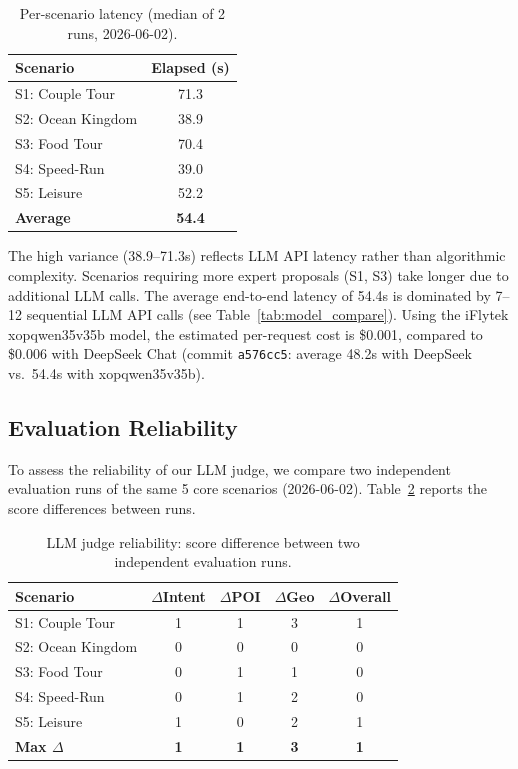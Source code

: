 \begin{table}[H]
\centering
\caption{Per-scenario latency (median of 2 runs, 2026-06-02).}
\label{tab:scenario_latency}
\begin{tabular}{@{}lc@{}}
\toprule
\textbf{Scenario} & \textbf{Elapsed (s)} \\
\midrule
S1: Couple Tour & 71.3 \\
S2: Ocean Kingdom & 38.9 \\
S3: Food Tour & 70.4 \\
S4: Speed-Run & 39.0 \\
S5: Leisure & 52.2 \\
\midrule
\textbf{Average} & \textbf{54.4} \\
\bottomrule
\end{tabular}
\end{table}

The high variance (38.9--71.3s) reflects LLM API latency rather than algorithmic complexity. Scenarios requiring more expert proposals (S1, S3) take longer due to additional LLM calls. The average end-to-end latency of 54.4s is dominated by 7--12 sequential LLM API calls (see Table~\ref{tab:model_compare}). Using the iFlytek xopqwen35v35b model, the estimated per-request cost is \$0.001, compared to \$0.006 with DeepSeek Chat (commit \texttt{a576cc5}: average 48.2s with DeepSeek vs.\ 54.4s with xopqwen35v35b).

\subsection{Evaluation Reliability}

To assess the reliability of our LLM judge, we compare two independent evaluation runs of the same 5 core scenarios (2026-06-02). Table~\ref{tab:consistency} reports the score differences between runs.

\begin{table}[H]
\centering
\caption{LLM judge reliability: score difference between two independent evaluation runs.}
\label{tab:consistency}
\begin{tabular}{@{}lcccc@{}}
\toprule
\textbf{Scenario} & \textbf{$\Delta$Intent} & \textbf{$\Delta$POI} & \textbf{$\Delta$Geo} & \textbf{$\Delta$Overall} \\
\midrule
S1: Couple Tour & 1 & 1 & 3 & 1 \\
S2: Ocean Kingdom & 0 & 0 & 0 & 0 \\
S3: Food Tour & 0 & 1 & 1 & 0 \\
S4: Speed-Run & 0 & 1 & 2 & 0 \\
S5: Leisure & 1 & 0 & 2 & 1 \\
\midrule
\textbf{Max $\Delta$} & \textbf{1} & \textbf{1} & \textbf{3} & \textbf{1} \\
\bottomrule
\end{tabular}
\end{table}


